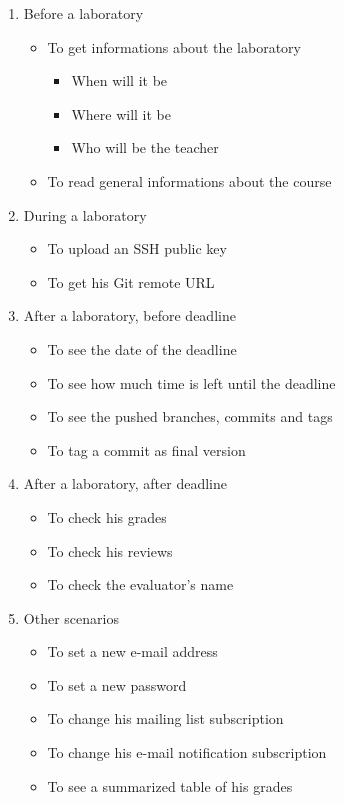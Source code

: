 \begin{enumerate}
	\item Before a laboratory
	\begin{itemize}
		\item To get informations about the laboratory
		\begin{itemize}
			\item When will it be
			\item Where will it be
			\item Who will be the teacher
		\end{itemize}
		\item To read general informations about the course
	\end{itemize}
	
	\item During a laboratory
	\begin{itemize}
		\item To upload an SSH public key
		\item To get his Git remote URL
	\end{itemize}
	
	\item After a laboratory, before deadline
	\begin{itemize}
		\item To see the date of the deadline
		\item To see how much time is left until the deadline
		\item To see the pushed branches, commits and tags
		\item To tag a commit as final version
	\end{itemize}
	
	\item After a laboratory, after deadline
	\begin{itemize}
		\item To check his grades
		\item To check his reviews
		\item To check the evaluator's name
	\end{itemize}
	
	\item Other scenarios
	\begin{itemize}
		\item To set a new e-mail address
		\item To set a new password
		\item To change his mailing list subscription
		\item To change his e-mail notification subscription
		\item To see a summarized table of his grades
	\end{itemize}
	
\end{enumerate}

